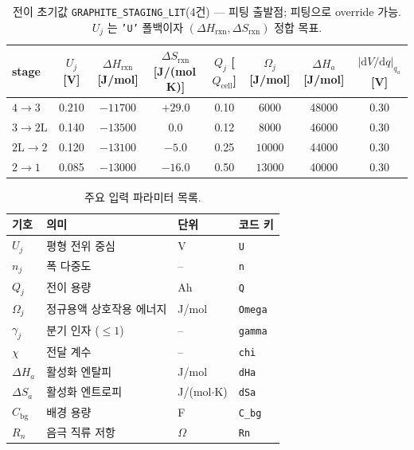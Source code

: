\documentclass[11pt,a4paper]{article}
\newcommand{\dd}{\mathrm{d}}
\newcommand{\cell}{\mathrm{cell}}
\newcommand{\bg}{\mathrm{bg}}
\newcommand{\rxn}{\mathrm{rxn}}
\newcommand{\code}[1]{\texttt{#1}}
\begin{document}
\begin{table}[ht]
\centering
\renewcommand{\arraystretch}{1.25}
\caption{전이 초기값 \code{GRAPHITE\_STAGING\_LIT}(4건) — 피팅 출발점; 피팅으로 override 가능.
$U_j$ 는 \code{'U'} 폴백이자 $(\Delta H_\rxn,\Delta S_\rxn)$ 정합 목표.\label{tab:staging}}
\small
\begin{tabular}{l c c c c c c c}
\toprule
stage & $U_j$ [V] & $\Delta H_\rxn$ [J/mol] & $\Delta S_\rxn$ [J/(mol\,K)]
      & $Q_j$ [$Q_\cell$] & $\Omega_j$ [J/mol] & $\Delta H_a$ [J/mol] & $|\dd V/\dd q|_{q_a}$ [V] \\
\midrule
$4\!\to\!3$              & 0.210 & $-11700$ & $+29.0$ & 0.10 & $ 6000$ & 48000 & 0.30 \\
$3\!\to\!2\mathrm{L}$   & 0.140 & $-13500$ & $  0.0$ & 0.12 & $ 8000$ & 46000 & 0.30 \\
$2\mathrm{L}\!\to\!2$   & 0.120 & $-13100$ & $ -5.0$ & 0.25 & $10000$ & 44000 & 0.30 \\
$2\!\to\!1$              & 0.085 & $-13000$ & $-16.0$ & 0.50 & $13000$ & 40000 & 0.30 \\
\bottomrule
\end{tabular}
\end{table}

\begin{table}[ht]
\centering
\caption{주요 입력 파라미터 목록.\label{tab:inputs}}
\small
\begin{tabular}{@{}llll@{}}
\toprule
기호 & 의미 & 단위 & 코드 키\\
\midrule
$U_j$ & 평형 전위 중심 & V & \code{U}\\
$n_j$ & 폭 다중도 & -- & \code{n}\\
$Q_j$ & 전이 용량 & Ah & \code{Q}\\
$\Omega_j$ & 정규용액 상호작용 에너지 & J/mol & \code{Omega}\\
$\gamma_j$ & 분기 인자 ($\le1$) & -- & \code{gamma}\\
$\chi$ & 전달 계수 & -- & \code{chi}\\
$\Delta H_a$ & 활성화 엔탈피 & J/mol & \code{dHa}\\
$\Delta S_a$ & 활성화 엔트로피 & J/(mol$\cdot$K) & \code{dSa}\\
$C_\bg$ & 배경 용량 & F & \code{C\_bg}\\
$R_n$ & 음극 직류 저항 & $\Omega$ & \code{Rn}\\
\bottomrule
\end{tabular}
\end{table}
\end{document}
